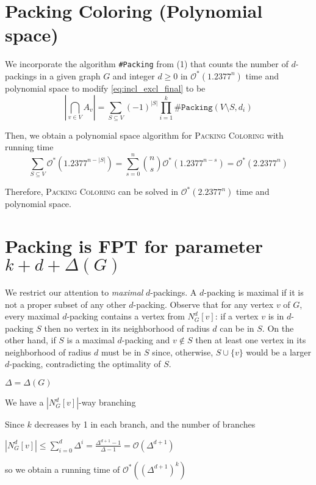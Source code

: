 \documentclass[10pt, a4paper]{article}
\theoremstyle{definition}
\newcommand{\mcO}{\mathcal{O}}
\begin{document}
\section{\sc Packing Coloring (\textnormal{Polynomial space})}

We incorporate the algorithm \texttt{\#Packing} from (1) that counts the number of $d$-packings in a given graph $G$ and integer $d \ge 0$ in $\mcO^*(1.2377^n)$ time and polynomial space to modify \cref{eq:incl_excl_final} to be
\begin{equation*}
	\left | \bigcap_{v \in V} A_v \right | 
	= \sum_{S \subseteq V} (-1)^{|S|} \prod_{i=1}^{k} \texttt{\#Packing}(V \setminus S, d_i)
\end{equation*}

Then, we obtain a polynomial space algorithm for \textsc{Packing Coloring} with running time
\begin{equation*}
	\sum_{S\subseteq V} \mcO^*(1.2377^{n-|S|}) = \sum_{s=0}^n \binom{n}{s} \mcO^*(1.2377^{n-s}) = \mcO^*(2.2377^n)
\end{equation*}

Therefore, \textsc{Packing Coloring} can be solved in $\mcO^*(2.2377^n)$ time and polynomial space.

\section{\sc Packing \textnormal{is FPT for parameter $k + d + \Delta (G)$} }

We restrict our attention to \emph{maximal} $d$-packings. A $d$-packing is maximal if it is not a proper subset of any other $d$-packing. Observe that for any vertex $v$ of $G$, every maximal $d$-packing contains a vertex from $N_G^d[v]$: if a vertex $v$ is in $d$-packing $S$ then no vertex in its neighborhood of radius $d$ can be in $S$. On the other hand, if $S$ is a maximal $d$-packing and $v \notin S$ then at least one vertex in its neighborhood of radius $d$ must be in $S$ since, otherwise, $S\cup \{ v \}$ would be a larger $d$-packing, contradicting the optimality of $S$.

$\Delta = \Delta(G)$

We have a $|N_G^d[v]|$-way branching

Since $k$ decreases by 1 in each branch, and the number of branches

$|N_G^d[v]| \leq \sum_{i=0}^{d} \Delta^i = \frac{\Delta^{d+1}-1}{\Delta-1} = \mcO(\Delta^{d+1})$ 

so we obtain a running time of $\mcO^{*}((\Delta^{d+1})^k)$
\end{document}
